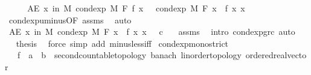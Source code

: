 \begin{isabellebody}
%
\isadelimproof
%
\endisadelimproof
%
\isatagproof
{}\isamarkupfalse%
\ {\isacharminus}{\kern0pt}\isanewline
\ \ \isamarkupfalse%
\ {\isachardoublequoteopen}AE\ x\ in\ M{\isachardot}{\kern0pt}\ cond{\isacharunderscore}{\kern0pt}exp\ M\ F\ f\ x\ {\isacharequal}{\kern0pt}\ {\isacharminus}{\kern0pt}\ cond{\isacharunderscore}{\kern0pt}exp\ M\ F\ {\isacharparenleft}{\kern0pt}{\isasymlambda}x{\isachardot}{\kern0pt}\ {\isacharminus}{\kern0pt}\ f\ x{\isacharparenright}{\kern0pt}\ x{\isachardoublequoteclose}\ \isamarkupfalse%
\ cond{\isacharunderscore}{\kern0pt}exp{\isacharunderscore}{\kern0pt}uminus{\isacharbrackleft}{\kern0pt}OF\ assms{\isacharparenleft}{\kern0pt}{}{\isacharparenright}{\kern0pt}{\isacharbrackright}{\kern0pt}\ \isamarkupfalse%
\ auto\isanewline
\ \ \isamarkupfalse%
\ \isamarkupfalse%
\ {\isachardoublequoteopen}AE\ x\ in\ M{\isachardot}{\kern0pt}\ cond{\isacharunderscore}{\kern0pt}exp\ M\ F\ {\isacharparenleft}{\kern0pt}{\isasymlambda}x{\isachardot}{\kern0pt}\ {\isacharminus}{\kern0pt}\ f\ x{\isacharparenright}{\kern0pt}\ x\ {\isachargreater}{\kern0pt}\ {\isacharminus}{\kern0pt}\ c{\isachardoublequoteclose}\ \ \isamarkupfalse%
\ assms\ \isamarkupfalse%
\ {\isacharparenleft}{\kern0pt}intro\ cond{\isacharunderscore}{\kern0pt}exp{\isacharunderscore}{\kern0pt}gr{\isacharunderscore}{\kern0pt}c{\isacharparenright}{\kern0pt}\ auto\isanewline
\ \ \isamarkupfalse%
\ \isamarkupfalse%
\ {\isacharquery}{\kern0pt}thesis\ \isamarkupfalse%
\ {\isacharparenleft}{\kern0pt}force\ simp\ add{\isacharcolon}{\kern0pt}\ minus{\isacharunderscore}{\kern0pt}less{\isacharunderscore}{\kern0pt}iff{\isacharparenright}{\kern0pt}\isanewline
{}\isamarkupfalse%
%
\endisatagproof
{\isafoldproof}%
%
\isadelimproof
\isanewline
%
\endisadelimproof
\isanewline
{}\isamarkupfalse%
\ cond{\isacharunderscore}{\kern0pt}exp{\isacharunderscore}{\kern0pt}mono{\isacharunderscore}{\kern0pt}strict{\isacharcolon}{\kern0pt}\isanewline
\ \ \ f\ {\isacharcolon}{\kern0pt}{\isacharcolon}{\kern0pt}\ {\isachardoublequoteopen}{\isacharprime}{\kern0pt}a\ {\isasymRightarrow}\ {\isacharprime}{\kern0pt}b\ {\isacharcolon}{\kern0pt}{\isacharcolon}{\kern0pt}\ {\isacharbraceleft}{\kern0pt}second{\isacharunderscore}{\kern0pt}countable{\isacharunderscore}{\kern0pt}topology{\isacharcomma}{\kern0pt}\ banach{\isacharcomma}{\kern0pt}\ linorder{\isacharunderscore}{\kern0pt}topology{\isacharcomma}{\kern0pt}\ ordered{\isacharunderscore}{\kern0pt}real{\isacharunderscore}{\kern0pt}vector{\isacharbraceright}{\kern0pt}{\isachardoublequoteclose}\isanewline

\end{isabellebody}
